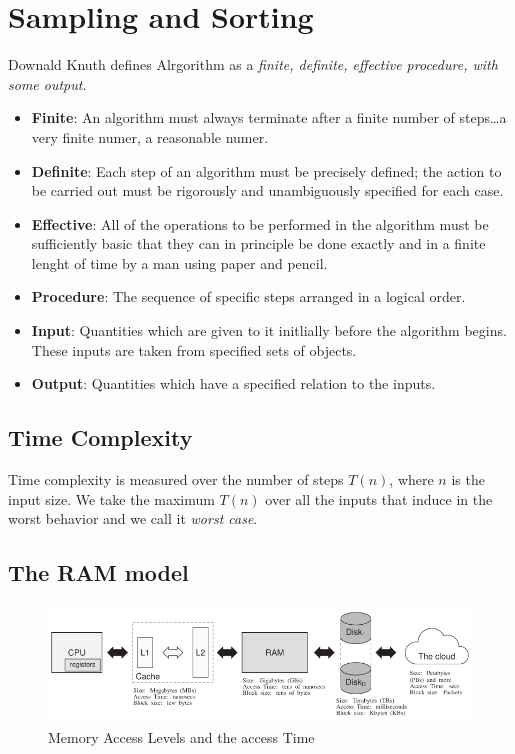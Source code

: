 \section{Sampling and Sorting}

\begin{definition}[Algorithm]
  Downald Knuth defines Alrgorithm as a \textit{finite, definite,
  effective procedure, with some output}.

  \begin{itemize}
    \item\textbf{Finite}: An algorithm must always terminate after a
      finite number of steps\dots a very finite numer, a reasonable numer.
    \item\textbf{Definite}: Each step of an algorithm must be
      precisely defined; the action to be carried out must be
      rigorously and unambiguously specified for each case.
    \item\textbf{Effective}: All of the operations to be performed
      in the algorithm must be sufficiently basic that they can in
      principle be done exactly and in a finite lenght of time by a
      man using paper and pencil.
    \item\textbf{Procedure}: The sequence of specific steps arranged
      in a logical order.
    \item\textbf{Input}: Quantities which are given to it initlially
      before the algorithm begins. These inputs are taken from
      specified sets of objects.
    \item \textbf{Output}: Quantities which have a specified relation
      to the inputs.
  \end{itemize}
\end{definition}

\subsection{Time Complexity}

Time complexity is measured over the number of steps $T(n)$, where
$n$ is the input size. We take the maximum $T(n)$ over
all the inputs that induce in the worst behavior and we call it
\textit{worst case}.

\subsection{The RAM model}

\begin{figure}[h!]
  \centering
  \includegraphics[width=1\textwidth]{images/memory_levels.png}
  \caption{Memory Access Levels and the access Time}
  \label{fig:memory_access_levels}
\end{figure}

